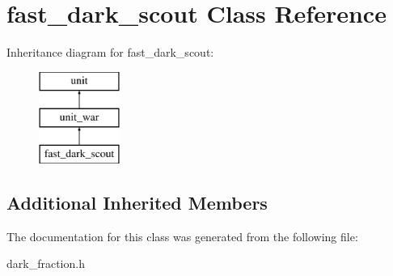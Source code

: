 \hypertarget{classfast__dark__scout}{}\section{fast\+\_\+dark\+\_\+scout Class Reference}
\label{classfast__dark__scout}
Inheritance diagram for fast\+\_\+dark\+\_\+scout\+:\begin{figure}[H]
\begin{center}
\leavevmode
\includegraphics[height=3.000000cm]{classfast__dark__scout}
\end{center}
\end{figure}
\subsection*{Additional Inherited Members}


The documentation for this class was generated from the following file\+:\begin{DoxyCompactItemize}
\item 
dark\+\_\+fraction.\+h\end{DoxyCompactItemize}
